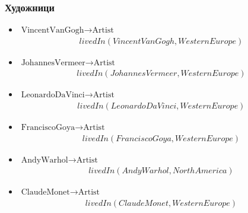 \documentclass[a4paper, 11pt]{article}
\begin{document}
\subsubsection*{Художници}
\begin{itemize}
  \item $\text{VincentVanGogh} \to \text{Artist}$
    \begin{align*}
      livedIn(VincentVanGogh, WesternEurope)
    \end{align*}
  \item $\text{JohannesVermeer} \to \text{Artist}$
    \begin{align*}
      livedIn(JohannesVermeer, WesternEurope)
    \end{align*}
  \item $\text{LeonardoDaVinci} \to \text{Artist}$
    \begin{align*}
      livedIn(LeonardoDaVinci, WesternEurope)
    \end{align*}
  \item $\text{FranciscoGoya} \to \text{Artist}$
    \begin{align*}
      livedIn(FranciscoGoya, WesternEurope)
    \end{align*}
  \item $\text{AndyWarhol} \to \text{Artist}$
    \begin{align*}
      livedIn(AndyWarhol, NorthAmerica)
    \end{align*}
  \item $\text{ClaudeMonet} \to \text{Artist}$
    \begin{align*}
      livedIn(ClaudeMonet, WesternEurope)
    \end{align*}
\end{itemize}
\end{document}
